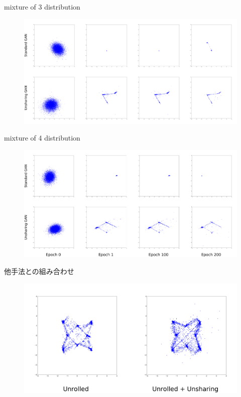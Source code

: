 \documentclass[dvipdfmx,12pt,unicode]{beamer}
\begin{document}
\begin{frame}{mixture of 3 distribution}
  \begin{figure}[htb]
    \centering    
    \includegraphics[width=\linewidth]{3_mixture_gan.png}
  \end{figure}
\end{frame}

\begin{frame}{mixture of 4 distribution}
  \begin{figure}[htb]
    \centering        
    \includegraphics[width=\linewidth]{4_mixture_gan.png}
  \end{figure}
\end{frame}

\begin{frame}{他手法との組み合わせ}
  \begin{figure}[htb]
    \centering        
      \includegraphics[width=\linewidth]{unrolled.png}
  \end{figure}
\end{frame}
\end{document}

